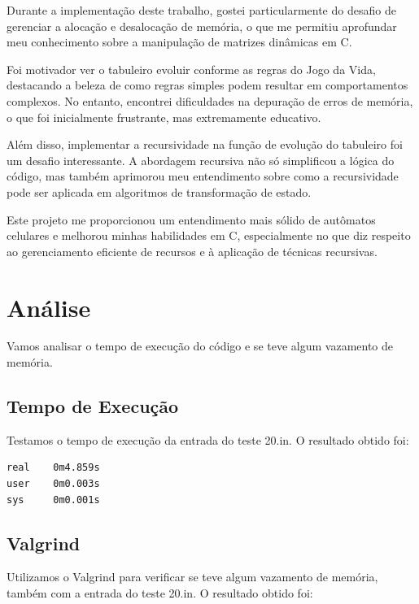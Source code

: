 \documentclass{article}
\begin{document}
\par Durante a implementação deste trabalho, gostei particularmente do desafio de gerenciar a alocação e desalocação de memória, o que me permitiu aprofundar meu conhecimento sobre a manipulação de matrizes dinâmicas em C.
\par Foi motivador ver o tabuleiro evoluir conforme as regras do Jogo da Vida, destacando a beleza de como regras simples podem resultar em comportamentos complexos. No entanto, encontrei dificuldades na depuração de erros de memória, o que foi inicialmente frustrante, mas extremamente educativo.
\par Além disso, implementar a recursividade na função de evolução do tabuleiro foi um desafio interessante. A abordagem recursiva não só simplificou a lógica do código, mas também aprimorou meu entendimento sobre como a recursividade pode ser aplicada em algoritmos de transformação de estado.
\par Este projeto me proporcionou um entendimento mais sólido de autômatos celulares e melhorou minhas habilidades em C, especialmente no que diz respeito ao gerenciamento eficiente de recursos e à aplicação de técnicas recursivas.

\section{Análise}

\par Vamos analisar o tempo de execução do código e se teve algum vazamento de memória.

\subsection{Tempo de Execução}
\par Testamos o tempo de execução da entrada do teste 20.in. O resultado obtido foi:

\begin{lstlisting}[caption={},label={lst:cod1},language={[x86masm]Assembler}]
real    0m4.859s
user    0m0.003s
sys     0m0.001s

 \end{lstlisting}

\subsection{Valgrind}
\par Utilizamos o Valgrind para verificar se teve algum vazamento de memória, também com a entrada do teste 20.in. O resultado obtido foi:
\end{document}
